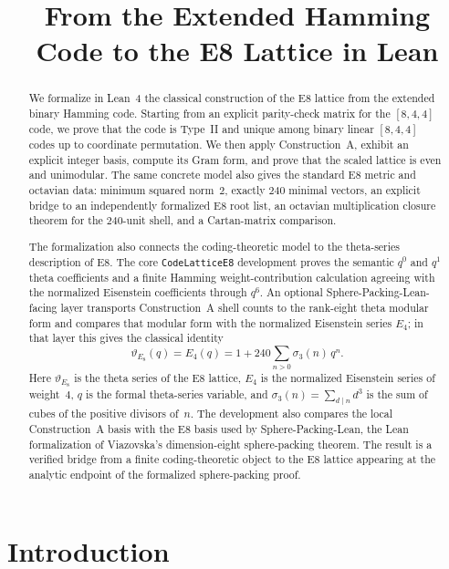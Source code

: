 \documentclass[12pt]{article}
\title{From the Extended Hamming Code to the E8 Lattice in Lean}
\author{}
\date{}
\theoremstyle{definition}
\newcommand{\code}[1]{\texttt{#1}}
\newcommand{\Theta}{\vartheta}
\begin{document}
\maketitle

\begin{abstract}
We formalize in Lean~4 the classical construction of the E8 lattice from the
extended binary Hamming code.  Starting from an explicit parity-check matrix
for the $[8,4,4]$ code, we prove that the code is Type~II and unique among
binary linear $[8,4,4]$ codes up to coordinate permutation.  We then apply
Construction~A, exhibit an explicit integer basis, compute its Gram form, and
prove that the scaled lattice is even and unimodular.  The same concrete model
also gives the standard E8 metric and octavian data: minimum squared norm~$2$,
exactly $240$ minimal vectors, an explicit bridge to an independently
formalized E8 root list, an octavian multiplication closure theorem for the
$240$-unit shell, and a Cartan-matrix comparison.

The formalization also connects the coding-theoretic model to the theta-series
description of E8.  The core \code{CodeLatticeE8} development proves the
semantic $q^0$ and $q^1$ theta coefficients and a finite Hamming
weight-contribution calculation agreeing with the normalized Eisenstein
coefficients through $q^6$.  An optional Sphere-Packing-Lean-facing layer
transports Construction~A shell counts to the rank-eight theta modular form and
compares that modular form with the normalized Eisenstein series $E_4$; in that
layer this gives the classical identity
\[
  \Theta_{E_8}(q) = E_4(q) = 1 + 240\sum_{n>0}\sigma_3(n)\,q^n.
\]
Here \(\Theta_{E_8}\) is the theta series of the E8 lattice, \(E_4\) is the
normalized Eisenstein series of weight~\(4\), \(q\) is the formal theta-series
variable, and \(\sigma_3(n)=\sum_{d\mid n} d^3\) is the sum of cubes of the
positive divisors of~\(n\).
The development also compares the local
Construction~A basis with the E8 basis used by Sphere-Packing-Lean, the Lean
formalization of Viazovska's dimension-eight sphere-packing theorem.  The
result is a verified bridge from a finite coding-theoretic object to the E8
lattice appearing at the analytic endpoint of the formalized sphere-packing
proof.
\end{abstract}

\section{Introduction}
\label{sec:intro}
\end{document}
